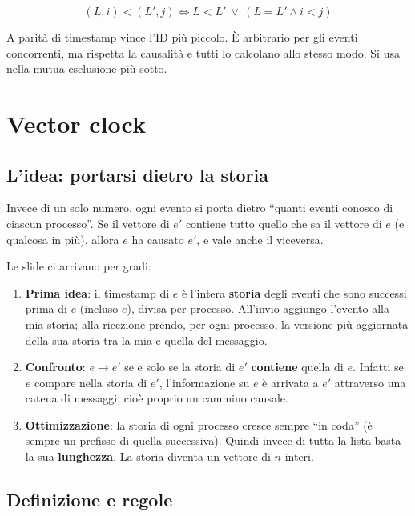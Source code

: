 \[
(L, i) < (L', j) \iff L < L' \ \lor\ (L = L' \land i < j)
\]

A parità di timestamp vince l'ID più piccolo. È arbitrario per gli eventi concorrenti, ma rispetta la causalità e tutti lo calcolano allo stesso modo. Si usa nella mutua esclusione più sotto.

\section{Vector clock}

\subsection{L'idea: portarsi dietro la storia}

\begin{inbreve}

Invece di un solo numero, ogni evento si porta dietro ``quanti eventi conosco di ciascun processo''. Se il vettore di \(e'\) contiene tutto quello che sa il vettore di \(e\) (e qualcosa in più), allora \(e\) ha causato \(e'\), e vale anche il viceversa.

\end{inbreve}

Le slide ci arrivano per gradi:

\begin{enumerate}
\def\labelenumi{\arabic{enumi}.}
\tightlist
\item
  \textbf{Prima idea}: il timestamp di \(e\) è l'intera \textbf{storia} degli eventi che sono successi prima di \(e\) (incluso \(e\)), divisa per processo. All'invio aggiungo l'evento alla mia storia; alla ricezione prendo, per ogni processo, la versione più aggiornata della sua storia tra la mia e quella del messaggio.
\item
  \textbf{Confronto}: \(e \to e'\) se e solo se la storia di \(e'\) \textbf{contiene} quella di \(e\). Infatti se \(e\) compare nella storia di \(e'\), l'informazione su \(e\) è arrivata a \(e'\) attraverso una catena di messaggi, cioè proprio un cammino causale.
\item
  \textbf{Ottimizzazione}: la storia di ogni processo cresce sempre ``in coda'' (è sempre un prefisso di quella successiva). Quindi invece di tutta la lista basta la sua \textbf{lunghezza}. La storia diventa un vettore di \(n\) interi.
\end{enumerate}

\subsection{Definizione e regole}

